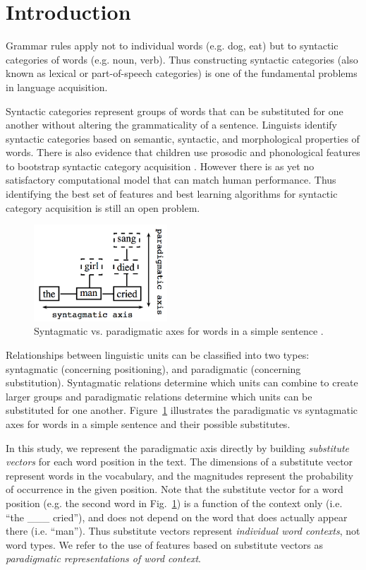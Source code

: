 \section{Introduction}
\label{sec:intro}

Grammar rules apply not to individual words (e.g. dog, eat) but to
syntactic categories of words (e.g. noun, verb).  Thus constructing
syntactic categories (also known as lexical or part-of-speech
categories) is one of the fundamental problems in language
acquisition.

Syntactic categories represent groups of words that can be substituted
for one another without altering the grammaticality of a sentence.
Linguists identify syntactic categories based on semantic, syntactic,
and morphological properties of words.  There is also evidence that
children use prosodic and phonological features to bootstrap syntactic
category acquisition \cite{ambridge2011child}.  However there is as
yet no satisfactory computational model that can match human
performance.  Thus identifying the best set of features and best
learning algorithms for syntactic category acquisition is still an
open problem.

\begin{figure}[b] \centering
\includegraphics[width=50mm]{paradigmatic.png}
% 
\caption{Syntagmatic vs. paradigmatic axes for words in a simple
  sentence \cite{chandler2007semiotics}.}
\label{fig:paradigmatic}
\end{figure}

Relationships between linguistic units can be classified into two
types: syntagmatic (concerning positioning), and paradigmatic
(concerning substitution).  Syntagmatic relations determine which
units can combine to create larger groups and paradigmatic relations
determine which units can be substituted for one another.
Figure~\ref{fig:paradigmatic} illustrates the paradigmatic vs
syntagmatic axes for words in a simple sentence and their possible
substitutes.  

In this study, we represent the paradigmatic axis directly by building
{\em substitute vectors} for each word position in the text.  The
dimensions of a substitute vector represent words in the vocabulary,
and the magnitudes represent the probability of occurrence in the given
position.  Note that the substitute vector for a word position (e.g.
the second word in Fig.~\ref{fig:paradigmatic}) is a function of the
context only (i.e. ``the \_\_\_ cried''), and does not depend on the
word that does actually appear there (i.e. ``man'').  Thus substitute
vectors represent {\em individual word contexts}, not word types.  We
refer to the use of features based on substitute vectors as 
{\em paradigmatic representations of word context}.

